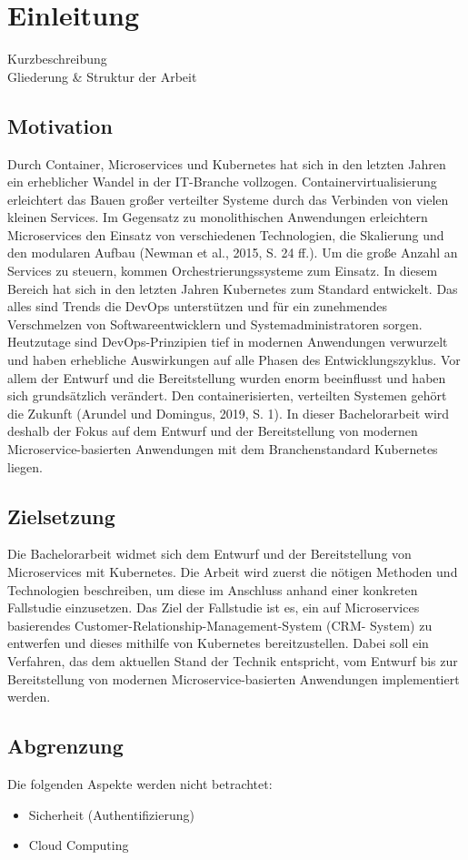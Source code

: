 \section{Einleitung}

Kurzbeschreibung \\
Gliederung \& Struktur der Arbeit


\subsection{Motivation}
Durch Container, Microservices und Kubernetes hat sich in den letzten Jahren ein erheblicher
Wandel in der IT-Branche vollzogen. Containervirtualisierung erleichtert das Bauen großer
verteilter Systeme durch das Verbinden von vielen kleinen Services. Im Gegensatz zu
monolithischen Anwendungen erleichtern Microservices den Einsatz von verschiedenen
Technologien, die Skalierung und den modularen Aufbau (Newman et al., 2015, S. 24 ff.).
Um die große Anzahl an Services zu steuern, kommen Orchestrierungssysteme zum Einsatz.
In diesem Bereich hat sich in den letzten Jahren Kubernetes zum Standard entwickelt. Das
alles sind Trends die DevOps unterstützen und für ein zunehmendes Verschmelzen von
Softwareentwicklern und Systemadministratoren sorgen. Heutzutage sind DevOps-Prinzipien
tief in modernen Anwendungen verwurzelt und haben erhebliche Auswirkungen auf alle
Phasen des Entwicklungszyklus. Vor allem der Entwurf und die Bereitstellung wurden enorm
beeinflusst und haben sich grundsätzlich verändert. Den containerisierten, verteilten Systemen
gehört die Zukunft (Arundel und Domingus, 2019, S. 1). In dieser Bachelorarbeit wird deshalb
der Fokus auf dem Entwurf und der Bereitstellung von modernen Microservice-basierten
Anwendungen mit dem Branchenstandard Kubernetes liegen.


\subsection{Zielsetzung}
Die Bachelorarbeit widmet sich dem Entwurf und der Bereitstellung von Microservices mit
Kubernetes. Die Arbeit wird zuerst die nötigen Methoden und Technologien beschreiben, um
diese im Anschluss anhand einer konkreten Fallstudie einzusetzen. Das Ziel der Fallstudie
ist es, ein auf Microservices basierendes Customer-Relationship-Management-System (CRM-
System) zu entwerfen und dieses mithilfe von Kubernetes bereitzustellen. Dabei soll ein
Verfahren, das dem aktuellen Stand der Technik entspricht, vom Entwurf bis zur Bereitstellung
von modernen Microservice-basierten Anwendungen implementiert werden.

\subsection{Abgrenzung}
Die folgenden Aspekte werden nicht betrachtet:
\begin{itemize}
\item Sicherheit (Authentifizierung)
\item Cloud Computing
\end{itemize}
